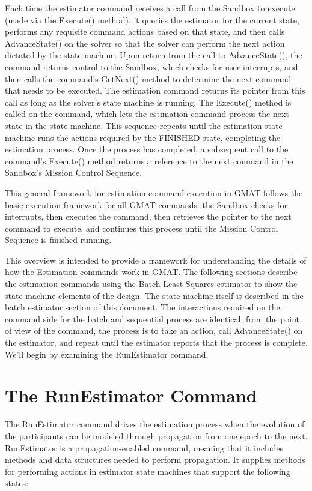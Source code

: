 Each time the estimator command receives a call from the Sandbox to execute (made via the Execute() method), it queries the estimator for the current state, performs any requisite command actions based on that state, and then calls AdvanceState() on the solver so that the solver can perform the next action dictated by the state machine.  Upon return from the call to AdvanceState(), the command returns control to the Sandbox, which checks for user interrupts, and then calls the command's GetNext() method to determine the next command that needs to be executed.  The estimation command returns its pointer from this call as long as the solver's state machine is running.  The Execute() method is called on the command, which lets the estimation command process the next state in the state machine.  This sequence repeats until the estimation state machine runs the actions required by the FINISHED state, completing the estimation process.  Once the process has completed, a subsequent call to the command's Execute() method returns a reference to the next command in the Sandbox's Mission Control Sequence.

This general framework for estimation command execution in GMAT follows the basic execution framework for all GMAT commands: the Sandbox checks for interrupts, then executes the command, then retrieves the pointer to the next command to execute, and continues this process until the Mission Control Sequence is finished running.

This overview is intended to provide a framework for understanding the details of how the Estimation commands work in GMAT.  The following sections describe the estimation commands using the Batch Least Squares estimator to show the state machine elements of the design.  The state machine itself is described in the batch estimator section of this document.  The interactions required on the command side for the batch and sequential process are identical; from the point of view of the command, the process is to take an action, call AdvanceState() on the estimator, and repeat until the estimator reports that the process is complete.  We'll begin by examining the RunEstimator command.

\section{The RunEstimator Command}

The RunEstimator command drives the estimation process when the evolution of the participants can be modeled through propagation from one epoch to the next.  RunEstimator is a propagation-enabled command, meaning that it includes methods and data structures needed to perform propagation.  It supplies methods for performing actions in estimator state machines that support the following states:

